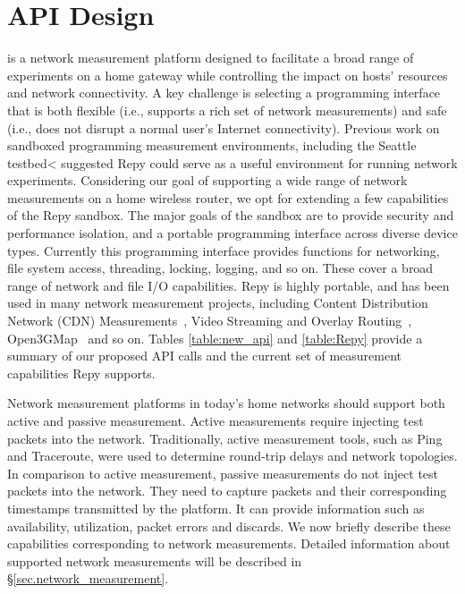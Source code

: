 \section{API Design}
{\raggedright
\sysname is a network measurement platform designed to facilitate a broad range
of experiments on a home gateway while controlling the impact on hosts' resources
 and network connectivity. A key challenge is selecting a programming interface
 that is both flexible (i.e., supports a rich set of network measurements) and safe
  (i.e., does not disrupt a normal user's Internet connectivity). Previous work
  on sandboxed programming measurement environments, including the Seattle testbed<
  suggested Repy could serve
  as a useful environment for running network experiments. Considering our goal
  of supporting a wide range of network measurements on a home wireless router,
  we opt for extending a few capabilities of the Repy sandbox\cite{cappos2010retaining}.
  The major goals of the sandbox are to provide security and performance isolation,
  and a portable programming interface across diverse device types.
  Currently this programming interface provides functions for networking, file
   system access, threading, locking, logging, and so on. These cover a broad range
    of network and file I/O capabilities. Repy is highly portable, and has been
  used in many network measurement projects, including Content Distribution Network
      (CDN) Measurements~\cite{rafetseder2011exploring}, Video Streaming and
      Overlay Routing~\cite{eisl2011service}, Open3GMap~\cite{open3gmap} and
      so on. Tables \ref{table:new_api} and \ref{table:Repy} provide a summary of
       our proposed API calls and the current set of measurement capabilities Repy supports.

Network measurement platforms in today's home networks should support both active
 and passive measurement. Active measurements require injecting test packets into
  the network. Traditionally, active measurement tools, such as Ping\cite{ping}
  and Traceroute\cite{traceroute}, were used to determine round-trip delays and
  network topologies. In comparison to active measurement, passive measurements
  do not inject test packets into the network. They need to capture packets and
  their corresponding timestamps transmitted by the platform. It can provide
   information such as availability, utilization, packet errors and discards\cite{calyamactive}.
    We now briefly describe these capabilities corresponding to network measurements.
  Detailed information about supported network measurements will be
described in \S{\ref{sec.network_measurement}}.

}
